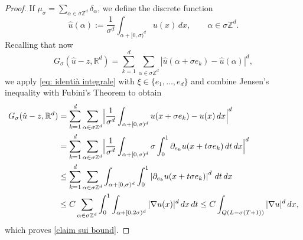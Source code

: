 \documentclass{article}
\theoremstyle{plain}
\theoremstyle{definition}
\def\rr{{\mathbb R}}
\def\ZZ{{\mathbb Z}}
\def\ms{\mu_\sigma}
\newcommand{\s}{\sigma}
\numberwithin{equation}{section}
\begin{document}
\begin{proof}
 If $\ms=\sum_{\alpha\in \s\ZZ^d}\delta_\alpha$, we define the discrete function
    \begin{equation*}
        \hat{u}(\alpha):=\frac{1}{\sigma^d}\int_{\alpha+[0,\sigma)^d}u(x)\, dx, \qquad \alpha\in \s\ZZ^d.
    \end{equation*}
Recalling that now
    \begin{equation*}
        G_\s(\hat{u}-z, \rr^d)= \sum_{k=1}^d\sum_{\alpha\in \s\ZZ^d} |\hat{u}(\alpha+\s e_k)-\hat{u}(\alpha)|^d,
    \end{equation*}
    we apply \eqref{eq: identià integrale} with $\xi\in\{e_1,\dots, e_d\}$ and combine Jensen's inequality with Fubini's Theorem to obtain 
    \begin{equation*}
        \begin{split}
            G_{\sigma}(\hat{u}-z,\mathbb{R}^d)
            &=\sum_{k=1}^d\sum_{\alpha\in \sigma\mathbb{Z}^d}\Bigl|\frac{1}{\sigma^d}\int_{\alpha+[0,\sigma)^d}u(x+ \sigma e_k)-u(x)\, dx\Bigr|^d\\
            & = \sum_{k=1}^d\sum_{\alpha\in \sigma\mathbb{Z}^d}\Bigl|\frac{1}{\sigma^d}\int_{\alpha+[0,\sigma)^d}\s\int_{0}^{1}\partial_{e_k}u(x+t\sigma e_k )\, dt\, dx\Bigr|^d\\   
            &\leq \sum_{k=1}^d\sum_{\alpha\in \sigma\mathbb{Z}^d}\int_{\alpha+[0,\sigma)^d}\int_0^1\left|\partial_{e_k}u(x+t\sigma  e_k)\right|^d\, dt\, dx\\
            &\leq C\sum_{\alpha\in \sigma\mathbb{Z}^d}\int_0^1\int_{\alpha+[0,2\sigma)^d}|\nabla u(x)|^d\, dx\, dt
            \leq C \int_{Q(L-\s(T+1))}|\nabla u |^d\, dx,
            \end{split}
    \end{equation*}
which proves \eqref{claim sui bound}.


\end{proof}
\end{document}
